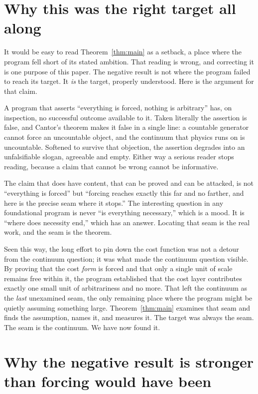 \documentclass[11pt,a4paper]{article}
\theoremstyle{definition}
\theoremstyle{remark}
\begin{document}
\section{Why this was the right target all along}

It would be easy to read Theorem~\ref{thm:main} as a setback, a place where the
program fell short of its stated ambition. That reading is wrong, and correcting
it is one purpose of this paper. The negative result is not where the
program failed to reach its target. It \emph{is} the target, properly understood.
Here is the argument for that claim.

A program that asserts ``everything is forced, nothing is arbitrary'' has, on
inspection, no successful outcome available to it. Taken literally the assertion
is false, and Cantor's theorem makes it false in a single line: a countable
generator cannot force an uncountable object, and the continuum that physics
runs on is uncountable. Softened to survive that objection, the assertion
degrades into an unfalsifiable slogan, agreeable and empty. Either way a serious
reader stops reading, because a claim that cannot be wrong cannot be informative.

The claim that does have content, that can be proved and can be attacked, is not
``everything is forced'' but ``forcing reaches exactly this far and no farther,
and here is the precise seam where it stops.'' The interesting question in any
foundational program is never ``is everything necessary,'' which is a mood. It is
``where does necessity end,'' which has an answer. Locating that seam is the real
work, and the seam is the theorem.

Seen this way, the long effort to pin down the cost function was not a detour
from the continuum question; it was what made the continuum question visible. By
proving that the cost \emph{form} is forced and that only a single unit of scale
remains free within it, the program established that the cost layer contributes
exactly one small unit of arbitrariness and no more. That left the continuum as
the \emph{last} unexamined seam, the only remaining place where the program might
be quietly assuming something large. Theorem~\ref{thm:main} examines that seam and
finds the assumption, names it, and measures it. The target was always the seam.
The seam is the continuum. We have now found it.

\section{Why the negative result is stronger than forcing would have been}
\end{document}
